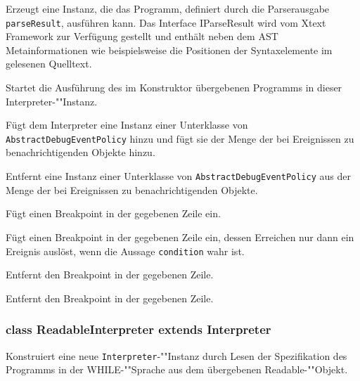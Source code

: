 \begin{description}
    Erzeugt eine Instanz, die das Programm, definiert durch die Parserausgabe \texttt{parseResult}, ausführen kann. Das Interface IParseResult wird vom Xtext Framework zur Verfügung gestellt und enthält neben dem AST Metainformationen wie beispielsweise die Positionen der Syntaxelemente im gelesenen Quelltext.

    Startet die Ausführung des im Konstruktor übergebenen Programms in dieser Interpreter-""Instanz.

    Fügt dem Interpreter eine Instanz einer Unterklasse von \texttt{AbstractDebugEventPolicy} hinzu und fügt sie der Menge der bei Ereignissen zu benachrichtigenden Objekte hinzu.

    Entfernt eine Instanz einer Unterklasse von \texttt{AbstractDebugEventPolicy} aus der Menge der bei Ereignissen zu benachrichtigenden Objekte.

    Fügt einen Breakpoint in der gegebenen Zeile ein.

    Fügt einen Breakpoint in der gegebenen Zeile ein, dessen Erreichen nur dann ein Ereignis auslöst, wenn die Aussage \texttt{condition} wahr ist.

    Entfernt den Breakpoint in der gegebenen Zeile.

    Entfernt den Breakpoint in der gegebenen Zeile.

\end{description}

\subsubsection{class ReadableInterpreter extends Interpreter}

\begin{description}
    Konstruiert eine neue \texttt{Interpreter}-""Instanz durch Lesen der Spezifikation des Programms in der WHILE-""Sprache aus dem übergebenen Readable-""Objekt.
\end{description}


